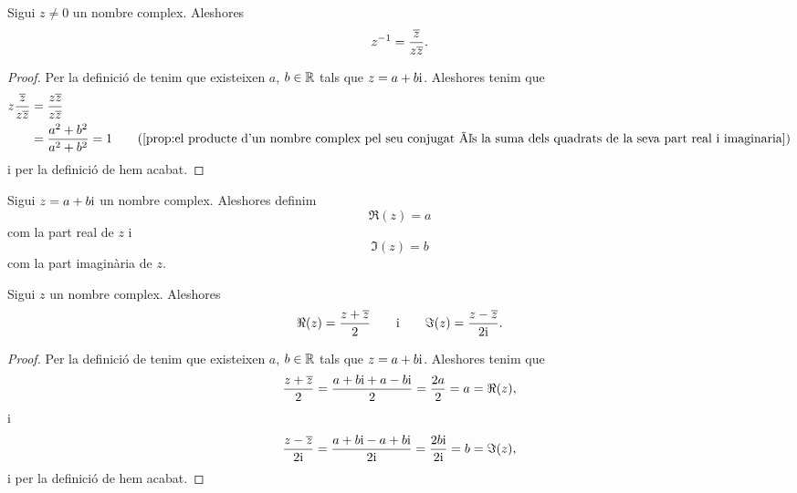 \documentclass[../../Main.tex]{subfiles}
\begin{document}
	\begin{proposition}
		\label{prop:inversa d'un nombre complex en funció del seu conjugat}
		Sigui \(z \neq 0\) un nombre complex.
        Aleshores
		\[
            z^{-1} = \frac{\overline{z}}{z\overline{z}}.
        \]
		\begin{proof}
			Per la definició de  tenim que existeixen \(a\), \(b\in\mathbb{R}\) tals que \(z = a+b\mathrm{i}\).
            Aleshores tenim que
			\begin{align*}
				z\frac{\conjugat{z}}{z\conjugat{z}} &= \frac{z\conjugat{z}}{z\conjugat{z}} \\
				 &= \frac{a^{2}+b^{2}}{a^{2}+b^{2}} = 1 \tag{\ref{prop:el producte d'un nombre complex pel seu conjugat és la suma dels quadrats de la seva part real i imaginaria}}
			\end{align*}
			i per la definició de  hem acabat.
		\end{proof}
	\end{proposition}
	\begin{definition}
		\label{def:part real i part imaginària d'un nombre complex}
		\label{def:part real d'un nombre complex}
		\label{def:part imaginària d'un nombre complex}
		Sigui \(z = a+b\mathrm{i}\) un nombre complex.
        Aleshores definim
		\[
            \Re(z) = a
        \]
		com la part real de \(z\) i
		\[
            \Im(z) = b
        \]
		com la part imaginària de \(z\).
	\end{definition}
	\begin{proposition}
		\label{prop:fórmules per la part real i part imaginària d'un nombre complex}
		\label{prop:fórmula per la part real d'un nombre complex}
		\label{prop:fórmula per la part imaginària d'un nombre complex}
		Sigui \(z\) un nombre complex.
        Aleshores
		\[
            \Re(z) = \frac{z+\overline{z}}{2}\qquad\text{i}\qquad\Im(z) = \frac{z-\overline{z}}{2\mathrm{i}}.
        \]
		\begin{proof}
			Per la definició de  tenim que existeixen \(a\), \(b\in\mathbb{R}\) tals que \(z = a+b\mathrm{i}\).
            Aleshores tenim que
			\[
                \frac{z+\overline{z}}{2} = \frac{a+b\mathrm{i}+a-b\mathrm{i}}{2} = \frac{2a}{2} = a = \Re(z),
            \]
			i
			\[
                \frac{z-\overline{z}}{2\mathrm{i}} = \frac{a+b\mathrm{i}-a+b\mathrm{i}}{2\mathrm{i}} = \frac{2b\mathrm{i}}{2\mathrm{i}} = b = \Im(z),
            \]
			i per la definició de  hem acabat.
		\end{proof}
	\end{proposition}
\end{document}
